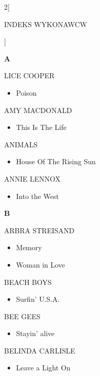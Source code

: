 \documentclass[a4paper]{report}
\begin{document}
\begin{multicols*}{2}[\begin{Huge}INDEKS WYKONAWCW\end{Huge}\vspace{1cm}]\begin{Large}\textbf{A}\end{Large}LICE COOPER 
\begin{itemize}[topsep=0pt]
\itemsep0em
\item[]  Poison   \\
\end{itemize}
 AMY MACDONALD 
\begin{itemize}[topsep=0pt]
\itemsep0em
\item[]  This Is The Life   \\
\end{itemize}
 ANIMALS 
\begin{itemize}[topsep=0pt]
\itemsep0em
\item[]  House Of The Rising Sun   \\
\end{itemize}
 ANNIE LENNOX 
\begin{itemize}[topsep=0pt]
\itemsep0em
\item[]  Into the West   \\
\end{itemize}
 \begin{Large}\textbf{B}\end{Large}ARBRA STREISAND 
\begin{itemize}[topsep=0pt]
\itemsep0em
\item[]  Memory   \\
\item[]  Woman in Love   \\
\end{itemize}
 BEACH BOYS 
\begin{itemize}[topsep=0pt]
\itemsep0em
\item[]  Surfin' U.S.A.   \\
\end{itemize}
 BEE GEES 
\begin{itemize}[topsep=0pt]
\itemsep0em
\item[]  Stayin' alive   \\
\end{itemize}
 BELINDA CARLISLE 
\begin{itemize}[topsep=0pt]
\itemsep0em
\item[]  Leave a Light On   \\

\end{itemize}
\end{multicols*}
\end{document}
